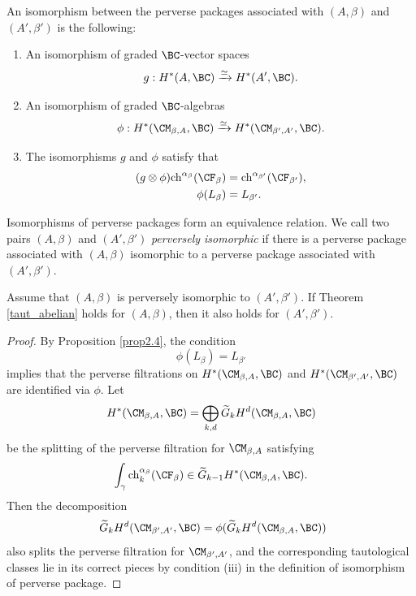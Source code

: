 An isomorphism between the perverse packages associated with $(A, \beta)$ and $(A', \beta')$ is the following:
\begin{enumerate}
    \item[(i)] An  isomorphism of  graded $\BC$-vector spaces
    \[
    g: H^*(A, \BC) \xrightarrow{\simeq} H^*(A', \BC).
    \]
    \item[(ii)] An isomorphism of graded  $\BC$-algebras
    \[
    \phi: H^*(\CM_{\beta,A}, \BC) \xrightarrow{\simeq} H^*(\CM_{\beta',A'}, \BC).
    \]
    \item[(iii)] The isomorphisms $g$ and $\phi$ satisfy that
    \[
    \begin{split}
        (g\otimes \phi) \mathrm{ch}^{\alpha_\beta} (\CF_\beta) & = \mathrm{ch}^{\alpha_{\beta'}}(\CF_{\beta'}),\\
        \phi(L_\beta) & = L_{\beta'}.
    \end{split}
    \]
\end{enumerate}
Isomorphisms of perverse packages form an equivalence relation. We call two pairs $(A, \beta)$ and $(A', \beta')$ \emph{perversely isomorphic} if there is a perverse package associated with $(A,\beta)$ isomorphic to a perverse package associated with $(A', \beta')$.

\begin{prop}
\notready\label{prop2.5}
Assume that $(A, \beta)$ is perversely isomorphic to $(A', \beta')$. If Theorem \ref{taut_abelian} holds for $(A, \beta)$, then it also holds for $(A', \beta')$.
\end{prop}

\begin{proof}
By Proposition \ref{prop2.4}, the condition
\[
\phi(L_\beta) = L_{\beta'}
\]
implies that the perverse filtrations on $H^*(\CM_{\beta,A}, \BC)$ and $H^*(\CM_{\beta', A'}, \BC)$ are identified via $\phi$. Let
\[
H^*(\CM_{\beta,A}, \BC) = \bigoplus_{k,d} \widetilde{G}_k H^d(\CM_{\beta,A}, \BC)
\]
be the splitting of the perverse filtration for $\CM_{\beta, A}$ satisfying
\[
\int_\gamma \mathrm{ch}^{\alpha_\beta}_k(\CF_\beta) \in \widetilde{G}_{k-1}H^*(\CM_{\beta,A}, \BC).
\]
Then the decomposition
\[
\
\widetilde{G}_k H^d(\CM_{\beta',A'}, \BC) = \phi(\widetilde{G}_k H^d(\CM_{\beta,A}, \BC))
\]
also splits the perverse filtration for $\CM_{\beta',A'}$, and the corresponding tautological classes lie in its correct pieces by  condition (iii) in the definition of isomorphism of perverse package.
\end{proof}

